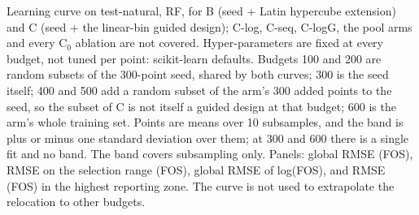 Learning curve on test-natural, RF, for B (seed + Latin hypercube extension) and C (seed + the linear-bin guided design); C-log, C-seq, C-logG, the pool arms and every C$_0$ ablation are not covered. Hyper-parameters are fixed at every budget, not tuned per point: scikit-learn defaults. Budgets 100 and 200 are random subsets of the 300-point seed, shared by both curves; 300 is the seed itself; 400 and 500 add a random subset of the arm's 300 added points to the seed, so the subset of C is not itself a guided design at that budget; 600 is the arm's whole training set. Points are means over 10 subsamples, and the band is plus or minus one standard deviation over them; at 300 and 600 there is a single fit and no band. The band covers subsampling only. Panels: global RMSE (FOS), RMSE on the selection range (FOS), global RMSE of log(FOS), and RMSE (FOS) in the highest reporting zone. The curve is not used to extrapolate the relocation to other budgets.
